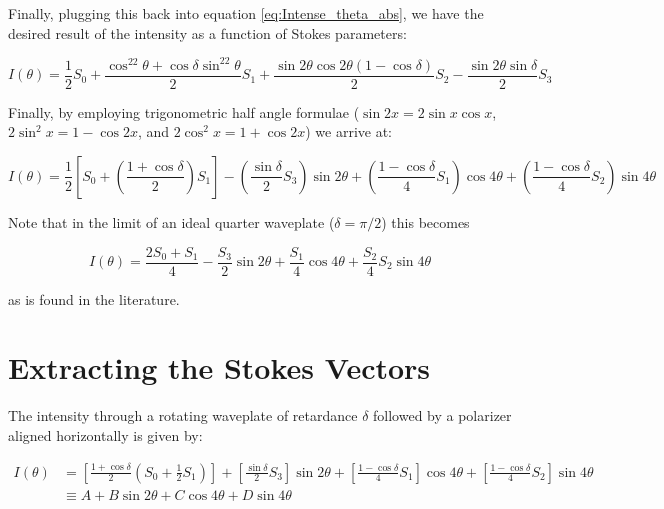 \documentclass{article}
\begin{document}
Finally, plugging this back into equation \ref{eq:Intense_theta_abs}, we have the desired result of the intensity as a function of Stokes parameters:

\begin{equation}
    \label{eq:Intense_theta_penultimate}
    I(\theta) = \frac{1}{2}S_0 + \frac{\cos^22\theta + \cos\delta\sin^22\theta}{2}S_1 + \frac{\sin2\theta\cos2\theta(1-\cos\delta)}{2}S_2 - \frac{\sin2\theta\sin\delta}{2}S_3
\end{equation}

Finally, by employing trigonometric half angle formulae ($\sin2x = 2\sin x\cos x$, $2\sin^2x = 1 - \cos2x$, and $2\cos^2x = 1 + \cos2x$) we arrive at:

\begin{equation}
    \label{eq:Intense_theta_ultimate}
    \boxed{I(\theta) = \frac{1}{2}\left[S_0 + \left(\frac{1+\cos\delta}{2}\right)S_1\right] - \left(\frac{\sin\delta}{2}S_3\right)\sin2\theta + \left(\frac{1-\cos\delta}{4}S_1\right)\cos4\theta + \left(\frac{1-\cos\delta}{4}S_2\right)\sin4\theta}
\end{equation}

Note that in the limit of an ideal quarter waveplate ($\delta = \pi/2$) this becomes

\begin{equation}
    \label{eq:Intense_theta_ultimate}
    I(\theta) =  \frac{2S_0+S_1}{4} - \frac{S_3}{2}\sin2\theta + \frac{S_1}{4}\cos4\theta + \frac{S_2}{4}S_2\sin4\theta
\end{equation}

\noindent as is found in the literature.

\section{Extracting the Stokes Vectors}
The intensity through a rotating waveplate of retardance $\delta$ followed by a polarizer aligned horizontally is given by:



\begin{align}
    \label{eq:intesityfromstokes}
    I(\theta) &= \left[\frac{1+\cos\delta}{2}\left(S_0 + \frac{1}{2}S_1\right)\right] + \left[\frac{\sin\delta}{2}S_3\right]\sin2\theta + \left[\frac{1-\cos\delta}{4}S_1\right]\cos4\theta + \left[\frac{1-\cos\delta}{4}S_2\right]\sin4\theta \nonumber\\
              &\equiv A + B\sin2\theta + C\cos4\theta + D\sin4\theta
\end{align}
\end{document}
